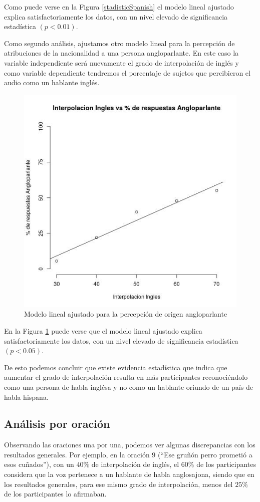 Como puede verse en la Figura \ref{stadisticSpanish} el modelo lineal ajustado explica satisfactoriamente los datos, con un nivel elevado de significancia estadística $(p<0.01)$.

Como segundo análisis, ajustamos otro modelo lineal para la percepción de atribuciones de la nacionalidad a una persona angloparlante. En este caso la variable independiente será nuevamente el grado de interpolación de inglés y como variable dependiente tendremos el porcentaje de sujetos que percibieron el audio como un hablante inglés.

\begin{figure}
\begin{center}
\includegraphics[trim={0 0 0 1.5cm},clip,width=.5\textwidth]{imagenes/estadistica/english.jpg}
\end{center}
\caption{Modelo lineal ajustado para la percepción de origen angloparlante}
\label{stadisticEnglish}
\end{figure}

En la Figura \ref{stadisticEnglish} puede verse que el modelo lineal ajustado explica satisfactoriamente los datos, con un nivel elevado de significancia estadística $(p<0.05)$.

De esto podemos concluir que existe evidencia estadística que indica que aumentar el grado de interpolación resulta en más participantes reconociéndolo como una persona de habla inglésa y no como un hablante oriundo de un país de habla hispana.

\subsection{Análisis por oración}

Observando las oraciones una por una, podemos ver algunas discrepancias con los resultados generales. Por ejemplo, en la oración $9$ (``Ese gruñón perro prometió a esos cuñados''), con un $40\%$ de interpolación de inglés, el $60\%$ de los participantes considera que la voz pertenece a un hablante de habla anglosajona, siendo que en los resultados generales, para ese mismo grado de interpolación, menos del $25\%$ de los participantes lo afirmaban.

